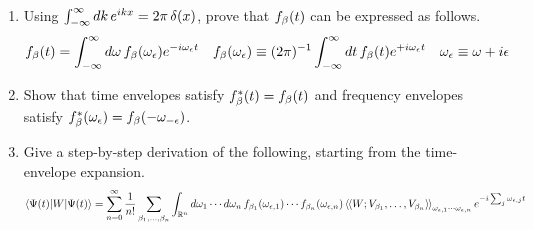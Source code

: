 \documentclass[11pt]{article}
\begin{document}
\begin{enumerate}
\item
Using
$\ts{
  \int_{-\infty}^\infty
  dk\,
  e^{ikx}
=
  2\pi\,\d(x)
}$,
prove that $f_{\beta }(t)$ can be expressed as follows.
\begin{align}
  f_\b(t)
=
  \int_{-\infty}^\infty
  d\w\,
  f_\b(\w_\ev)
  e^{-i\w_\ev t}
&&
  f_\b(\w_\ev)
\equiv
  (2\pi)^{-1}
  \int_{-\infty}^\infty
  dt\,
  f_\b(t)
  e^{+i\w_\ev t}
&&
  \w_\ev
\equiv
  \w
+
  i\ev
\end{align}

\item
  Show that time envelopes satisfy $f_{\beta }^*(t)=f_{\beta }(t)$ and frequency envelopes satisfy $f_{\beta }^*(\omega _{\epsilon })=f_{\beta }(-\omega _{-\epsilon })$.\footnotemark
{}

\item
  Give a step-by-step derivation of the following, starting from the time-envelope expansion.
\begin{align*}
  \langle\Psi (t)|W|\Psi (t)\rangle
=
  \sum_{n=0}^\infty
  \frac {1}{n!}
  \sum_{\beta _1,\ldots,\beta _n}
  \int_{\mathbb{R}^n}
  d\omega _1\cdots d\omega _n\,
  f_{\beta _1}(\omega _{\epsilon ,1})
  \cdots
  f_{\beta _n}(\omega _{\epsilon ,n})\,
  {{\langle}\hspace{-1pt}{\langle}} W; V_{\beta _1},\ldots,V_{\beta _n} {{\rangle}\hspace{-1pt}{\rangle}}_{\omega _{\epsilon ,1}\cdots\omega _{\epsilon ,n}}\,
  e^{-i\sum_j\omega _{\epsilon ,j}t}
\end{align*}
\end{enumerate}
\end{document}
